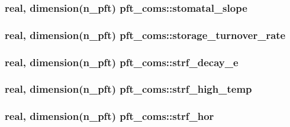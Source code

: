 \subsubsection[{\texorpdfstring{stomatal\+\_\+slope}{stomatal_slope}}]{\setlength{\rightskip}{0pt plus 5cm}real, dimension(n\+\_\+pft) pft\+\_\+coms\+::stomatal\+\_\+slope}\hypertarget{namespacepft__coms_a36d072c9dc75fed2a29770bb892c0c8d}{}\label{namespacepft__coms_a36d072c9dc75fed2a29770bb892c0c8d}
\subsubsection[{\texorpdfstring{storage\+\_\+turnover\+\_\+rate}{storage_turnover_rate}}]{\setlength{\rightskip}{0pt plus 5cm}real, dimension(n\+\_\+pft) pft\+\_\+coms\+::storage\+\_\+turnover\+\_\+rate}\hypertarget{namespacepft__coms_ac6e0048b175e1bdd410e60c25eddd828}{}\label{namespacepft__coms_ac6e0048b175e1bdd410e60c25eddd828}
\subsubsection[{\texorpdfstring{strf\+\_\+decay\+\_\+e}{strf_decay_e}}]{\setlength{\rightskip}{0pt plus 5cm}real, dimension(n\+\_\+pft) pft\+\_\+coms\+::strf\+\_\+decay\+\_\+e}\hypertarget{namespacepft__coms_a5cfdb0129f160897b6cc37536a67cfc5}{}\label{namespacepft__coms_a5cfdb0129f160897b6cc37536a67cfc5}
\subsubsection[{\texorpdfstring{strf\+\_\+high\+\_\+temp}{strf_high_temp}}]{\setlength{\rightskip}{0pt plus 5cm}real, dimension(n\+\_\+pft) pft\+\_\+coms\+::strf\+\_\+high\+\_\+temp}\hypertarget{namespacepft__coms_a065e5f350ad9ac77d9a66c7486268fb8}{}\label{namespacepft__coms_a065e5f350ad9ac77d9a66c7486268fb8}
\subsubsection[{\texorpdfstring{strf\+\_\+hor}{strf_hor}}]{\setlength{\rightskip}{0pt plus 5cm}real, dimension(n\+\_\+pft) pft\+\_\+coms\+::strf\+\_\+hor}\hypertarget{namespacepft__coms_a7ef86f21ed213453006c76ac60401a75}{}\label{namespacepft__coms_a7ef86f21ed213453006c76ac60401a75}
